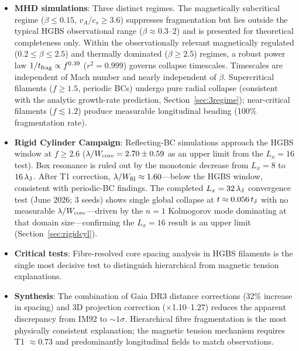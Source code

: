 \documentclass[twoside,twocolumn]{mnras}
\begin{document}
\begin{itemize}
    \item \textbf{MHD simulations}: Three distinct regimes. The magnetically subcritical
    regime ($\beta \leq 0.15$, $v_A/c_s \geq 3.6$) suppresses fragmentation but lies outside
    the typical HGBS observational range ($\beta \approx 0.3$--$2$) and is presented for
    theoretical completeness only. Within the observationally relevant magnetically regulated
    ($0.2 \leq \beta \leq 2.5$) and thermally dominated ($\beta \geq 2.5$) regimes, a robust
    power law $1/t_{\rm frag} \propto f^{0.39}$ ($r^2 = 0.999$) governs collapse timescales.
    Timescales are independent of Mach number and nearly independent of $\beta$. Supercritical
    filaments ($f \geq 1.5$, periodic BCs) undergo pure radial collapse (consistent with the
    analytic growth-rate prediction, Section~\ref{sec:3regime}); near-critical filaments
    ($f \lesssim 1.2$) produce measurable longitudinal beading (100\% fragmentation rate).

    \item \textbf{Rigid Cylinder Campaign}: Reflecting-BC simulations approach the HGBS window at $f \geq 2.6$ ($\lambda/W_{\rm core} = 2.70 \pm 0.59$ as an upper limit from the $L_x=16$ test). Box resonance is
    ruled out by the monotonic decrease from $L_x = 8$ to $16\,\lambda_{\rm J}$.
    After T1 correction, $\lambda/W_{\rm fil} \approx 1.60$---below the HGBS window,
    consistent with periodic-BC findings. The completed $L_x = 32\,\lambda_{\rm J}$
    convergence test (June 2026; 3 seeds) shows single global collapse at
    $t \approx 0.056\,t_{\rm J}$ with no measurable $\lambda/W_{\rm core}$---driven by
    the $n=1$ Kolmogorov mode dominating at that domain size---confirming the $L_x = 16$
    result is an upper limit (Section~\ref{sec:rigidcyl}).

    \item \textbf{Critical tests}: Fibre-resolved core spacing analysis in HGBS
    filaments is the single most decisive test to distinguish hierarchical from magnetic
    tension explanations.

    \item \textbf{Synthesis}: The combination of Gaia DR3 distance corrections (32\% increase in spacing) and 3D projection correction ($\times$1.10--1.27) reduces the apparent discrepancy from IM92 to ${\sim}1\sigma$. Hierarchical fibre fragmentation is the most physically consistent explanation; the magnetic tension mechanism requires T1 $\approx 0.73$ and predominantly longitudinal fields to match observations.

\end{itemize}
\end{document}
